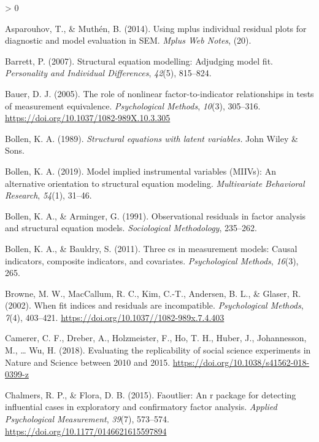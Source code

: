 \documentclass[
  english,
  man]{apa6}
\newlength{\cslhangindent}
\newenvironment{CSLReferences}[2] %
 {%
  \setlength{\parindent}{0pt}
  \ifodd #1 \everypar{\setlength{\hangindent}{\cslhangindent}}\ignorespaces\fi
  \ifnum #2 > 0
  \setlength{\parskip}{#2\baselineskip}
  \fi
 }%
 {}
\begin{document}
\hypertarget{refs}{}
\begin{CSLReferences}{1}{0}
\leavevmode\hypertarget{ref-asparouhov2014using}{}%
Asparouhov, T., \& Muthén, B. (2014). Using mplus individual residual plots for diagnostic and model evaluation in SEM. \emph{Mplus Web Notes}, (20).

\leavevmode\hypertarget{ref-barrett2007structural}{}%
Barrett, P. (2007). Structural equation modelling: Adjudging model fit. \emph{Personality and Individual Differences}, \emph{42}(5), 815--824.

\leavevmode\hypertarget{ref-Bauer2005}{}%
Bauer, D. J. (2005). {The role of nonlinear factor-to-indicator relationships in tests of measurement equivalence}. \emph{Psychological Methods}, \emph{10}(3), 305--316. \url{https://doi.org/10.1037/1082-989X.10.3.305}

\leavevmode\hypertarget{ref-bollen_structural_1989}{}%
Bollen, K. A. (1989). \emph{{Structural equations with latent variables.}} John Wiley {\&} Sons.

\leavevmode\hypertarget{ref-bollen2019model}{}%
Bollen, K. A. (2019). Model implied instrumental variables ({MIIVs}): An alternative orientation to structural equation modeling. \emph{Multivariate Behavioral Research}, \emph{54}(1), 31--46.

\leavevmode\hypertarget{ref-bollen1991observational}{}%
Bollen, K. A., \& Arminger, G. (1991). Observational residuals in factor analysis and structural equation models. \emph{Sociological Methodology}, 235--262.

\leavevmode\hypertarget{ref-bollen2011three}{}%
Bollen, K. A., \& Bauldry, S. (2011). Three cs in measurement models: Causal indicators, composite indicators, and covariates. \emph{Psychological Methods}, \emph{16}(3), 265.

\leavevmode\hypertarget{ref-Browne2002}{}%
Browne, M. W., MacCallum, R. C., Kim, C.-T., Andersen, B. L., \& Glaser, R. (2002). {When fit indices and residuals are incompatible}. \emph{Psychological Methods}, \emph{7}(4), 403--421. \url{https://doi.org/10.1037//1082-989x.7.4.403}

\leavevmode\hypertarget{ref-Camerer2018}{}%
Camerer, C. F., Dreber, A., Holzmeister, F., Ho, T. H., Huber, J., Johannesson, M., \ldots{} Wu, H. (2018). {Evaluating the replicability of social science experiments in Nature and Science between 2010 and 2015}. \url{https://doi.org/10.1038/s41562-018-0399-z}

\leavevmode\hypertarget{ref-faoutlier}{}%
Chalmers, R. P., \& Flora, D. B. (2015). Faoutlier: An r package for detecting influential cases in exploratory and confirmatory factor analysis. \emph{Applied Psychological Measurement}, \emph{39}(7), 573--574. \url{https://doi.org/10.1177/0146621615597894}


\end{CSLReferences}
\end{document}

